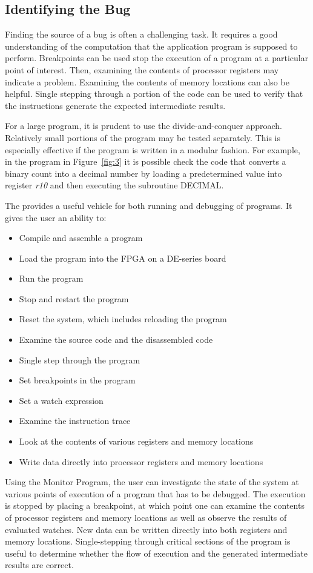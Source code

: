 \documentclass[11pt, twoside, pdftex]{article}
\begin{document}
\subsection{Identifying the Bug}
Finding the source of a bug is often a challenging task. It requires a good
understanding of the computation that the application program is supposed to
perform. Breakpoints can be used stop the execution of a program at a particular 
point of interest. Then, examining the contents of processor registers
may indicate a problem. Examining the contents of memory locations can also be
helpful. Single stepping through a portion of the code can be used to verify
that the instructions generate the expected intermediate results.

For a large program, it is prudent to use the divide-and-conquer approach.
Relatively small portions of the program may be tested separately. This is
especially effective if the program is written in a modular fashion. For example,
in the program in Figure~\ref{fig:3} it is possible check the code that converts a binary
count into a decimal number by loading a predetermined value into register
{\it r10} and then executing the subroutine DECIMAL.

The \productNameMed{} provides a useful vehicle for both running and
debugging of programs.
It gives the user an ability to: 
\begin{itemize}
\item Compile and assemble a program
\item Load the program into the FPGA on a DE-series board
\item Run the program
\item Stop and restart the program
\item Reset the system, which includes reloading the program
\item Examine the source code and the disassembled code
\item Single step through the program
\item Set breakpoints in the program
\item Set a watch expression
\item Examine the instruction trace
\item Look at the contents of various registers and memory locations
\item Write data directly into processor registers and memory locations 
\end{itemize}

\noindent
Using the Monitor Program, the user can investigate the state of the system
at various points of execution of a program that has to be debugged.
The execution is stopped by placing a breakpoint, at which point one can
examine the contents of processor registers and memory locations as well
as observe the results of evaluated watches. New data can be
written directly into both registers and memory locations. Single-stepping
through critical sections of the program is useful to determine whether the
flow of execution and the generated intermediate results are correct.
\end{document}
